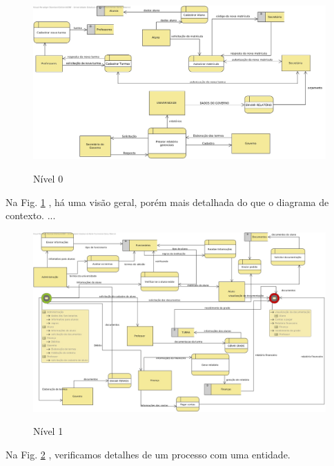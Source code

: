                 
                 
               
                  
               \begin{figure}[H]
               \caption{Nível 0}
               \centering %
                \includegraphics[width=13cm]{analisedeProjeto/DFDFisico} %
                \label{figura:DFDFisico}
                \end{figure}
                Na Fig. \ref{figura:DFDFisico} , há uma visão geral, porém mais detalhada do que o diagrama de contexto. ...
                  
              
                  
               \begin{figure}[H]
               \caption{Nível 1}
               \centering %
                \includegraphics[width=13cm]{analisedeProjeto/Nivel1} %
                \label{figura:Nivel1}
                \end{figure}
                Na Fig. \ref{figura:Nivel1} , verificamos detalhes de um processo com uma entidade.
                  
